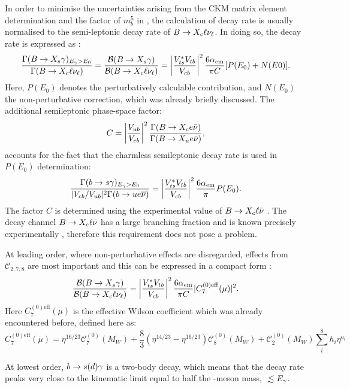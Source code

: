 In order to minimise the uncertainties arising from the CKM matrix element determination and the factor of $m_b^5$ in , the calculation of \BtoXsgamma decay rate is usually normalised to the semi-leptonic decay rate of $B\rightarrow X_c\ell\nu_{\ell}$.
In doing so, the decay rate is expressed as \cite{Misiak:2020vlo}:
\begin{equation}\label{eq:normalised_br}
    \frac{\Gamma({B\rightarrow X_{s} \gamma})_{{E_{\gamma}}>E_0}}{\Gamma(B\rightarrow X_c\ell\nu_\ell)} = \frac{\mathcal{B}({B\rightarrow X_{s} \gamma})}{\mathcal{B}(B\rightarrow X_c\ell\nu_\ell)} = \left|\frac{V_{ts}^*V_{tb}}{V_{cb}}\right|^2\frac{6\alpha_{\mathrm{em}}}{\pi C}[P(E_0)+N(E0)].
\end{equation}
Here, $P(E_0)$ denotes the perturbatively calculable contribution, and $N(E_0)$ the non-perturbative correction, which was already briefly discussed.
The additional semileptonic phase-space factor:
\begin{equation}
    C = \left|\frac{V_{ub}}{V_{cb}}\right|^2 \frac{\Gamma(B\rightarrow X_ce\bar{\nu})}{\Gamma(B\rightarrow X_ue\bar{\nu})},
\end{equation}  
accounts for the fact that the charmless semileptonic decay rate is used in $P(E_0)$ determination:
\begin{equation}
    \frac{\Gamma(b\rightarrow s\gamma)_{{E_{\gamma}}>E_0}}{|V_{cb}/V_{ub}|^2 \Gamma(b\rightarrow u e\overline{\nu})} = \left|\frac{V_{ts}^*V_{tb}}{V_{cb}}\right|^2 \frac{6\alpha_{\mathrm{em}}}{\pi}P(E_0).
\end{equation}
The factor $C$ is determined using the experimental value of $B\rightarrow X_c \ell\bar{\nu}$ \cite{Alberti:2014yda}.
The decay channel $B\rightarrow X_c \ell\bar{\nu}$ has a large branching fraction and is known precisely experimentally \cite{Workman:2022ynf}, therefore this requirement does not pose a problem.

At leading order, where non-perturbative effects are disregarded, effects from $\mathcal{C}_{2,7,8}$ are most important and this can be expressed in a compact form \cite{Buras:1993xp}:
\begin{equation}
    \frac{\mathcal{B}({B\rightarrow X_{s} \gamma})}{\mathcal{B}(B\rightarrow X_c\ell\nu_\ell)} = \left|\frac{V_{ts}^*V_{tb}}{V_{cb}}\right|^2\frac{6\alpha_{\mathrm{em}}}{\pi C}|C_{7}^{(0)\mathrm{eff}}(\mu)|^2.
\end{equation}
Here $C_{7}^{(0)\mathrm{eff}}(\mu)$ is the effective Wilson coefficient which was already encountered before, defined here as:
\begin{equation}
    C_{7}^{(0)\mathrm{eff}}(\mu) = \eta^{16/23}\mathcal{C}^{(0)}_7(M_W) + \frac{8}{3} \left(\eta^{14/23}-\eta^{16/23}\right)\mathcal{C}^{(0)}_8(M_W) + \mathcal{C}^{(0)}_2(M_W) \sum_i^8h_i\eta^{a_i}
\end{equation}


At lowest order, $b\rightarrow s(d) \gamma$ is a two-body decay, which means that the decay rate peaks very close to the kinematic limit equal to half the \B-meson mass, $\lsim E_{\g}$.
